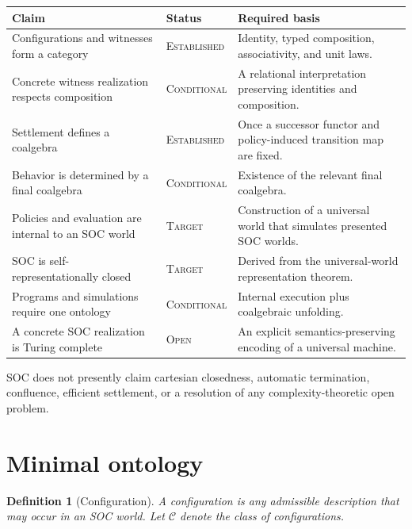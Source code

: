 \documentclass[11pt]{article}
\newtheorem{definition}{Definition}[section]
\theoremstyle{remark}
\newcommand{\Conf}{\mathcal{C}}
\newcommand{\Established}{\textsc{Established}}
\newcommand{\Conditional}{\textsc{Conditional}}
\newcommand{\Target}{\textsc{Target}}
\newcommand{\Open}{\textsc{Open}}
\begin{document}
\begin{center}
\begin{tabular}{@{}p{}p{}p{}@{}}
\toprule
Claim & Status & Required basis \\
\midrule
Configurations and witnesses form a category &
\Established &
Identity, typed composition, associativity, and unit laws. \\

Concrete witness realization respects composition &
\Conditional &
A relational interpretation preserving identities and composition. \\

Settlement defines a coalgebra &
\Established &
Once a successor functor and policy-induced transition map are fixed. \\

Behavior is determined by a final coalgebra &
\Conditional &
Existence of the relevant final coalgebra. \\

Policies and evaluation are internal to an SOC world &
\Target &
Construction of a universal world that simulates presented SOC worlds. \\

SOC is self-representationally closed &
\Target &
Derived from the universal-world representation theorem. \\

Programs and simulations require one ontology &
\Conditional &
Internal execution plus coalgebraic unfolding. \\

A concrete SOC realization is Turing complete &
\Open &
An explicit semantics-preserving encoding of a universal machine. \\
\bottomrule
\end{tabular}
\end{center}

SOC does not presently claim cartesian closedness, automatic termination,
confluence, efficient settlement, or a resolution of any complexity-theoretic
open problem.

\section{Minimal ontology}

\begin{definition}[Configuration]
A \emph{configuration} is any admissible description that may occur in an SOC
world. Let $\Conf$ denote the class of configurations.
\end{definition}
\end{document}
